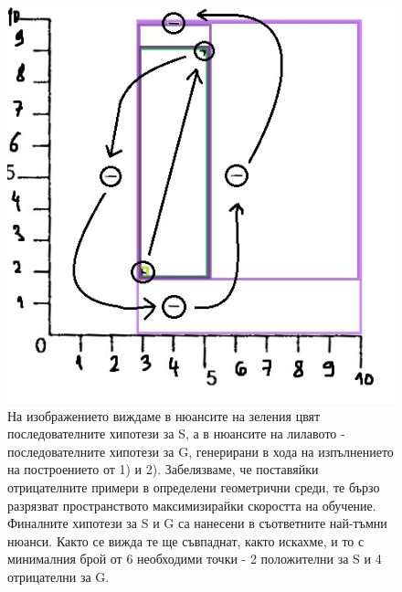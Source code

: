 \documentclass[12pt]{article}
\begin{document}
	\newpage
	\begin{figure}[H]
		\centering
		\includegraphics[width=130mm]{Untitled3.jpg} 
		\caption{На изображението виждаме в нюансите на зеления цвят последователните хипотези за S, а в нюансите на лилавото - последователните хипотези за G, генерирани в хода на изпълнението на построението от 1) и 2). Забелязваме, че поставяйки отрицателните примери в определени геометрични среди, те бързо разрязват пространството максимизирайки скоростта на обучение. Финалните хипотези за S и G са нанесени в съответните най-тъмни нюанси. Както се вижда те ще съвпаднат, както искахме, и то с минималния брой от 6 необходими точки - 2 положителни за S и 4 отрицателни за G.}
	\end{figure}
	
	
	
	
\end{document}
